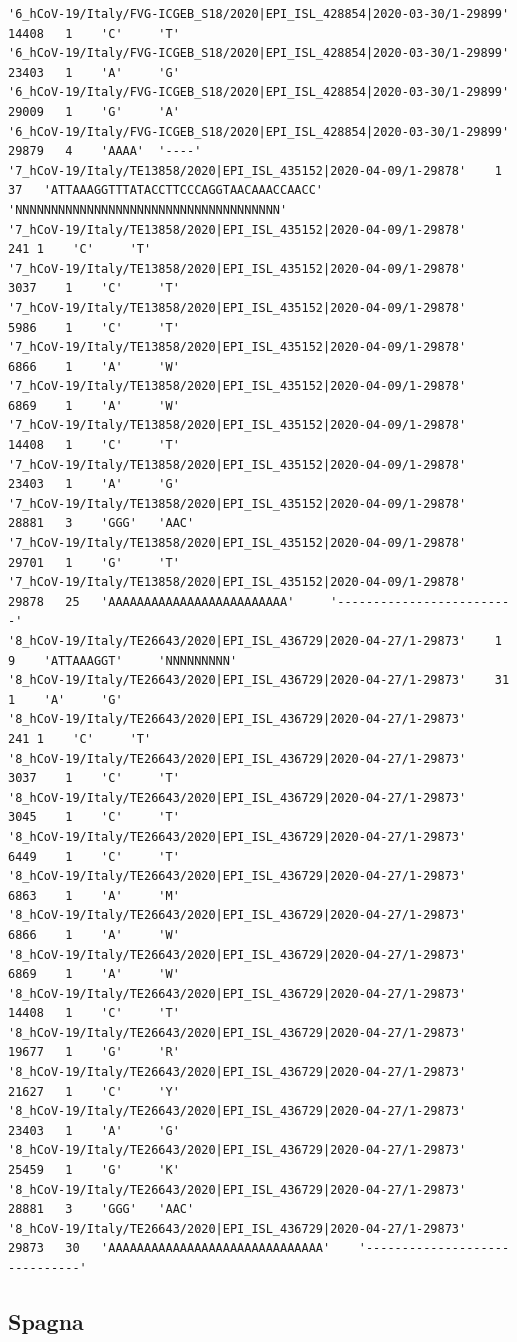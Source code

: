 \documentclass[a4paper,10pt]{article}
\begin{document}
\begin{verbatim}
'6_hCoV-19/Italy/FVG-ICGEB_S18/2020|EPI_ISL_428854|2020-03-30/1-29899'	14408	1	 'C'	 'T'
'6_hCoV-19/Italy/FVG-ICGEB_S18/2020|EPI_ISL_428854|2020-03-30/1-29899'	23403	1	 'A'	 'G'
'6_hCoV-19/Italy/FVG-ICGEB_S18/2020|EPI_ISL_428854|2020-03-30/1-29899'	29009	1	 'G'	 'A'
'6_hCoV-19/Italy/FVG-ICGEB_S18/2020|EPI_ISL_428854|2020-03-30/1-29899'	29879	4	 'AAAA'	 '----'
'7_hCoV-19/Italy/TE13858/2020|EPI_ISL_435152|2020-04-09/1-29878'	1	37	 'ATTAAAGGTTTATACCTTCCCAGGTAACAAACCAACC'	 'NNNNNNNNNNNNNNNNNNNNNNNNNNNNNNNNNNNNN'
'7_hCoV-19/Italy/TE13858/2020|EPI_ISL_435152|2020-04-09/1-29878'	241	1	 'C'	 'T'
'7_hCoV-19/Italy/TE13858/2020|EPI_ISL_435152|2020-04-09/1-29878'	3037	1	 'C'	 'T'
'7_hCoV-19/Italy/TE13858/2020|EPI_ISL_435152|2020-04-09/1-29878'	5986	1	 'C'	 'T'
'7_hCoV-19/Italy/TE13858/2020|EPI_ISL_435152|2020-04-09/1-29878'	6866	1	 'A'	 'W'
'7_hCoV-19/Italy/TE13858/2020|EPI_ISL_435152|2020-04-09/1-29878'	6869	1	 'A'	 'W'
'7_hCoV-19/Italy/TE13858/2020|EPI_ISL_435152|2020-04-09/1-29878'	14408	1	 'C'	 'T'
'7_hCoV-19/Italy/TE13858/2020|EPI_ISL_435152|2020-04-09/1-29878'	23403	1	 'A'	 'G'
'7_hCoV-19/Italy/TE13858/2020|EPI_ISL_435152|2020-04-09/1-29878'	28881	3	 'GGG'	 'AAC'
'7_hCoV-19/Italy/TE13858/2020|EPI_ISL_435152|2020-04-09/1-29878'	29701	1	 'G'	 'T'
'7_hCoV-19/Italy/TE13858/2020|EPI_ISL_435152|2020-04-09/1-29878'	29878	25	 'AAAAAAAAAAAAAAAAAAAAAAAAA'	 '-------------------------'
'8_hCoV-19/Italy/TE26643/2020|EPI_ISL_436729|2020-04-27/1-29873'	1	9	 'ATTAAAGGT'	 'NNNNNNNNN'
'8_hCoV-19/Italy/TE26643/2020|EPI_ISL_436729|2020-04-27/1-29873'	31	1	 'A'	 'G'
'8_hCoV-19/Italy/TE26643/2020|EPI_ISL_436729|2020-04-27/1-29873'	241	1	 'C'	 'T'
'8_hCoV-19/Italy/TE26643/2020|EPI_ISL_436729|2020-04-27/1-29873'	3037	1	 'C'	 'T'
'8_hCoV-19/Italy/TE26643/2020|EPI_ISL_436729|2020-04-27/1-29873'	3045	1	 'C'	 'T'
'8_hCoV-19/Italy/TE26643/2020|EPI_ISL_436729|2020-04-27/1-29873'	6449	1	 'C'	 'T'
'8_hCoV-19/Italy/TE26643/2020|EPI_ISL_436729|2020-04-27/1-29873'	6863	1	 'A'	 'M'
'8_hCoV-19/Italy/TE26643/2020|EPI_ISL_436729|2020-04-27/1-29873'	6866	1	 'A'	 'W'
'8_hCoV-19/Italy/TE26643/2020|EPI_ISL_436729|2020-04-27/1-29873'	6869	1	 'A'	 'W'
'8_hCoV-19/Italy/TE26643/2020|EPI_ISL_436729|2020-04-27/1-29873'	14408	1	 'C'	 'T'
'8_hCoV-19/Italy/TE26643/2020|EPI_ISL_436729|2020-04-27/1-29873'	19677	1	 'G'	 'R'
'8_hCoV-19/Italy/TE26643/2020|EPI_ISL_436729|2020-04-27/1-29873'	21627	1	 'C'	 'Y'
'8_hCoV-19/Italy/TE26643/2020|EPI_ISL_436729|2020-04-27/1-29873'	23403	1	 'A'	 'G'
'8_hCoV-19/Italy/TE26643/2020|EPI_ISL_436729|2020-04-27/1-29873'	25459	1	 'G'	 'K'
'8_hCoV-19/Italy/TE26643/2020|EPI_ISL_436729|2020-04-27/1-29873'	28881	3	 'GGG'	 'AAC'
'8_hCoV-19/Italy/TE26643/2020|EPI_ISL_436729|2020-04-27/1-29873'	29873	30	 'AAAAAAAAAAAAAAAAAAAAAAAAAAAAAA'	 '------------------------------'
\end{verbatim}

\subsection{Spagna}
\end{document}
